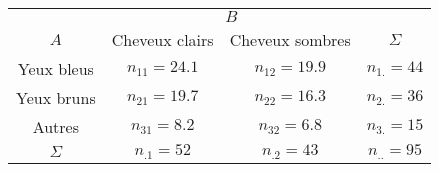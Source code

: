 \documentclass{standalone}
\begin{document}
\begin{tabular}{c|cc|c}
	\hline
	&\multicolumn{2}{c}{$B$}\\
	\cline{2-3}
	$A$ & Cheveux clairs & Cheveux sombres & $\Sigma$\\
	\hline
	Yeux bleus & $n_{11}= 24.1$ & $n_{12}= 19.9$ & $n_{1.} = 44$\\
	Yeux bruns & $n_{21}= 19.7$ & $n_{22}= 16.3$ & $n_{2.}=36$\\ Autres     & $n_{31}= 8.2$  & $n_{32}= 6.8 $ & $n_{3.}=15$\\
	\hline
	$ \Sigma$ & $n_{.1} = 52$ & $n_{.2} = 43$ & $n_{..}=95$\\
\end{tabular}
\end{document}
